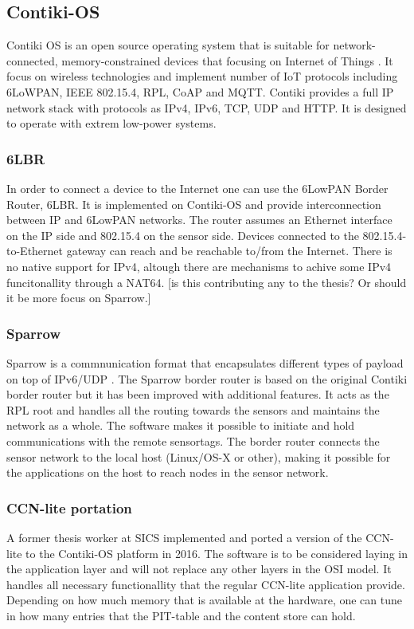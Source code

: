 \subsection{Contiki-OS}
Contiki OS is an open source operating system that is suitable for network-connected, memory-constrained devices that focusing on Internet of Things \cite{contiki-os}. It focus on wireless technologies and implement number of IoT protocols including 6LoWPAN, IEEE 802.15.4, RPL, CoAP and MQTT. Contiki provides a full IP network stack with protocols as IPv4, IPv6, TCP, UDP and HTTP. It is designed to operate with extrem low-power systems.

\subsubsection{6LBR}
In order to connect a device to the Internet one can use the 6LowPAN Border Router, 6LBR\cite{6LBR}. It is implemented on Contiki-OS and provide interconnection between IP and 6LowPAN networks. The router assumes an Ethernet interface on the IP side and 802.15.4 on the sensor side. Devices connected to the 802.15.4-to-Ethernet gateway can reach and be reachable to/from the Internet. There is no native support for IPv4, altough there are mechanisms to achive some IPv4 funcitonallity through a NAT64. [is this contributing any to the thesis? Or should it be more focus on Sparrow.]

\subsubsection{Sparrow}
Sparrow is a commnunication format that encapsulates different types of payload on top of IPv6/UDP \cite{Sparrow}. The Sparrow border router is based on the original Contiki border router but it has been improved with additional features. It acts as the RPL root and handles all the routing towards the sensors and maintains the network as a whole. The software makes it possible to initiate and hold communications with the remote sensortags. The border router connects the sensor network to the local host (Linux/OS-X or other), making it possible for the applications on the host to reach nodes in the sensor network. 

\subsubsection{CCN-lite portation}
A former thesis worker at SICS implemented and ported a version of the CCN-lite\cite{CCN-LITE} to the Contiki-OS platform in 2016\cite{yanqui}. The software is to be considered laying in the application layer and will not replace any other layers in the OSI model. It handles all necessary functionallity that the regular CCN-lite application provide. Depending on how much memory that is available at the hardware, one can tune in how many entries that the PIT-table and the content store can hold. 
